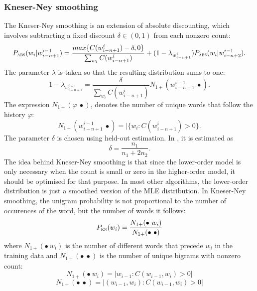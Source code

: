 	\subsubsection*{Kneser-Ney smoothing}
	The Kneser-Ney smoothing is an extension of absolute discounting, which involves subtracting a fixed discount $\delta \in (0, 1)$ from each nonzero count:
	\begin{equation}
		P_{\textsc{abs}}(w_{i}|w_{i-n+1}^{i-1})= \frac{max\{C(w_{i-n+1}^{i})-\delta, 0\}}{\sum_{w_{i}}C(w_{i-n+1}^{i})}+(1-\lambda_{w_{i-n+1}^{i}})P_{\textsc{abs}}(w_{i}|w_{i-n+2}^{i-1}).
	\end{equation}
	The parameter $\lambda$ is taken so that the resulting distribution sums to one:
	\begin{equation}
		1-\lambda_{w_{i-n+1}^{i-1}}=\frac{\delta}{\sum_{w_{i}}C(w_{i-n+1}^{i})}N_{1+}(w_{i-n+1}^{i-1}~\bullet).
	\end{equation}
	The expression $N_{1+}(\varphi~\bullet)$, denotes the number of unique words that follow the history $\varphi$:
	\begin{equation}
		N_{1+}(w_{i-n+1}^{i-1}~\bullet)=|\{w_{i}:C(w_{i-n+1}^{i}) > 0\}.
	\end{equation}
	The parameter $\delta$ is chosen using held-out estimation. In \cite{ney1994structuring}, it is estimated as 
	\begin{equation}
		\delta=\frac{n_{1}}{n_{1}+2n_{2}}.
	\end{equation}
	The idea behind Kneser-Ney smoothing is that since the lower-order model is only necessary when the count is small or zero in the higher-order model, it should be optimised for that purpose. In most other algorithms, the lower-order distribution is just a smoothed version of the MLE distribution. In Kneser-Ney smoothing, the unigram probability is not proportional to the number of occurences of the word, but the number of words it follows:
	\begin{equation}
		P_{\textsc{kn}}(w_{i})=\frac{N_{1+}(\bullet~w_{i})}{N_{1+}(\bullet~\bullet)}
		\label{equation:kneser-ney}
	\end{equation}
	where $N_{1+}(\bullet~w_{i})$ is the number of different words that precede $w_{i}$ in the training data and $N_{1+}(\bullet~\bullet)$ is the number of unique bigrams with nonzero count:
	\begin{equation}
		N_{1+}(\bullet~w_{i})=|{w_{i-1}:C(w_{i-1}, w_{i})>0}|
	\end{equation}
	\begin{equation}
		N_{1+}(\bullet~\bullet)=|{(w_{i-1}, w_{i}):C(w_{i-1}, w_{i})>0}|
	\end{equation}
